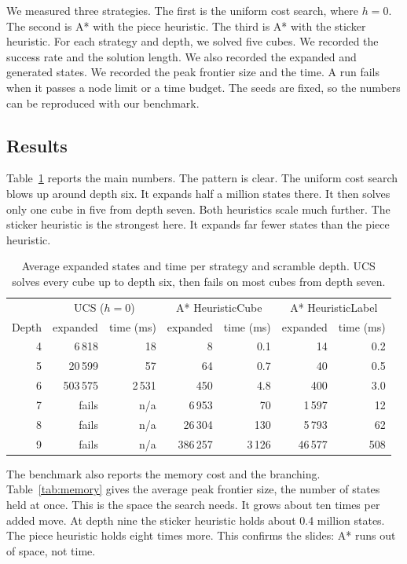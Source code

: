 \documentclass[11pt,a4paper]{article}
\begin{document}
We measured three strategies. The first is the uniform cost search, where $h = 0$.
The second is A* with the piece heuristic. The third is A* with the sticker
heuristic. For each strategy and depth, we solved five cubes. We recorded the
success rate and the solution length. We also recorded the expanded and generated
states. We recorded the peak frontier size and the time. A run fails when it passes
a node limit or a time budget. The seeds are fixed, so the numbers can be
reproduced with our benchmark.

\subsection{Results}

Table~\ref{tab:results} reports the main numbers. The pattern is clear. The
uniform cost search blows up around depth six. It expands half a million states
there. It then solves only one cube in five from depth seven. Both heuristics
scale much further. The sticker heuristic is the strongest here. It expands far
fewer states than the piece heuristic.

\begin{table}[H]
\centering
\small
\begin{tabular}{r|rr|rr|rr}
\toprule
 & \multicolumn{2}{c|}{UCS ($h=0$)} & \multicolumn{2}{c|}{A* HeuristicCube} & \multicolumn{2}{c}{A* HeuristicLabel} \\
Depth & expanded & time (ms) & expanded & time (ms) & expanded & time (ms) \\
\midrule
4 & 6\,818 & 18 & 8 & 0.1 & 14 & 0.2 \\
5 & 20\,599 & 57 & 64 & 0.7 & 40 & 0.5 \\
6 & 503\,575 & 2\,531 & 450 & 4.8 & 400 & 3.0 \\
7 & fails & n/a & 6\,953 & 70 & 1\,597 & 12 \\
8 & fails & n/a & 26\,304 & 130 & 5\,793 & 62 \\
9 & fails & n/a & 386\,257 & 3\,126 & 46\,577 & 508 \\
\bottomrule
\end{tabular}
\caption{Average expanded states and time per strategy and scramble depth. UCS
solves every cube up to depth six, then fails on most cubes from depth seven.}
\label{tab:results}
\end{table}

The benchmark also reports the memory cost and the branching. Table~\ref{tab:memory}
gives the average peak frontier size, the number of states held at once. This is
the space the search needs. It grows about ten times per added move. At depth nine
the sticker heuristic holds about 0.4 million states. The piece heuristic holds
eight times more. This confirms the slides: A* runs out of space, not time.
\end{document}
